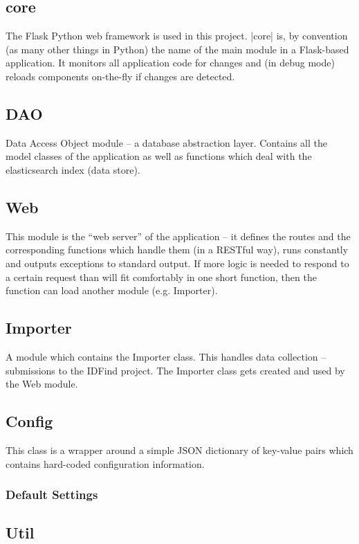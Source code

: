 \subsection{core}
The Flask Python web framework is used in this project. %
|core| is, by convention (as many other things in Python) the name of the main module in a Flask-based application. It monitors all application code for changes and (in debug mode) reloads components on-the-fly if changes are detected.

\subsection{DAO}
Data Access Object module – a database abstraction layer. Contains all the model classes of the application as well as functions which deal with the elasticsearch index (data store).

\subsection{Web}
This module is the ``web server'' of the application – it defines the routes and the corresponding functions which handle them (in a RESTful way), runs constantly and outputs exceptions to standard output. If more logic is needed to respond to a certain request than will fit comfortably in one short function, then the function can load another module (e.g. Importer).

\subsection{Importer}
A module which contains the Importer class. This handles data collection – submissions to the IDFind project. The Importer class gets created and used by the Web module.

\subsection{Config}
This class is a wrapper around a simple JSON dictionary of key-value pairs which contains hard-coded configuration information.

\subsubsection{Default Settings}

\subsection{Util}


